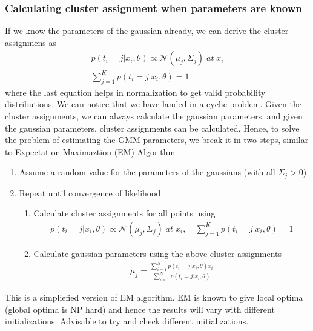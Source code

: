 \documentclass[../statistical_learning_notes.tex]{subfiles}
\begin{document}
    \subsubsection*{Calculating cluster assignment when parameters are known}
    If we know the parameters of the gaussian already, we can derive the cluster assignmens as
    \begin{gather*}
        p(t_{i} = j|x_{i}, \theta) \propto \mathcal{N}(\mu_{j}, \Sigma_{j}) \; at \; x_{i}\\
        \sum_{j=1}^{K} p(t_{i} = j|x_{i}, \theta) = 1
    \end{gather*}
    where the last equation helps in normalization to get valid probability distributions.\newline
    We can notice that we have landed in a cyclic problem. Given the cluster assignments, we can always calculate the gaussian parameters, and given the gaussian parameters, cluster assignments can be calculated.\newline
    Hence, to solve the problem of estimating the GMM parameters, we break it in two steps, similar to Expectation Maximaztion (EM) Algorithm
    \begin{enumerate}
        \item Assume a random value for the parameters of the gaussians (with all $\Sigma_{j} > 0$)
        \item Repeat until convergence of likelihood
        \begin{enumerate}
            \item Calculate cluster assignments for all points using
            \begin{align*}
                p(t_{i} = j|x_{i}, \theta) \propto \mathcal{N}(\mu_{j}, \Sigma_{j}) \; at \; x_{i}, \quad \sum_{j=1}^{K} p(t_{i} = j|x_{i}, \theta) = 1
            \end{align*}
            \item Calculate gaussian parameters using the above cluster assignments
            \begin{align*}
                \mu_{j} = \frac{\sum_{i=1}^{N} p(t_{i} = j|x_{i}, \theta) x_{i}}{\sum_{i=1}^{N} p(t_{i} = j|x_{i}, \theta)}
            \end{align*}
        \end{enumerate}
    \end{enumerate}

    This is a simpliefied version of EM algorithm. EM is known to give local optima (global optima is NP hard) and hence the results will vary with different initializations. Advisable to try and check different initializations.
\end{document}
